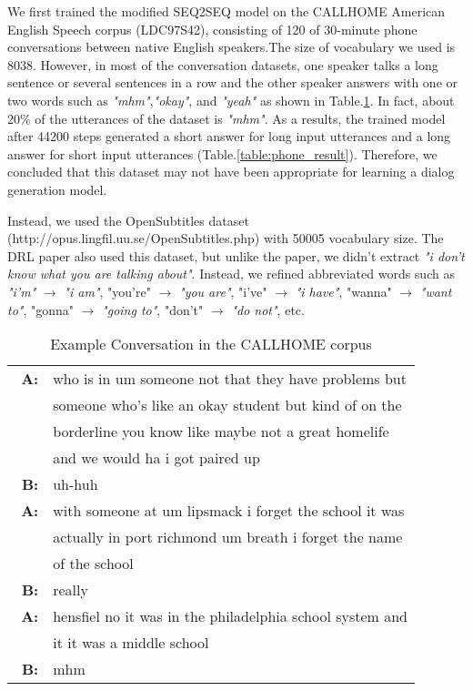 We first trained the modified SEQ2SEQ model on the CALLHOME American English Speech corpus (LDC97S42), consisting of 120 of 30-minute phone conversations between native English speakers.The size of vocabulary we used is 8038. However, in most of the conversation datasets, one speaker talks a long sentence or several sentences in a row and the other speaker answers with one or two words such as \textit{"mhm"},\textit{"okay"}, and \textit{"yeah"} as shown in Table.\ref{table:phone_data}. In fact, about 20\% of the utterances of the dataset is \textit{"mhm"}. As a results, the trained model after 44200 steps generated a short answer for long input utterances and a long answer for short input utterances (Table.\ref{table:phone_result}). Therefore, we concluded that this dataset may not have been appropriate for learning a dialog generation model.

Instead, we used the OpenSubtitles dataset (http://opus.lingfil.uu.se/OpenSubtitles.php) with 50005 vocabulary size. The DRL paper also used this dataset, but unlike the paper, we didn't extract \textit{"i don't know what you are talking about"}. Instead, we refined abbreviated words such as \textit{"i'm"} $\rightarrow$ \textit{"i am"}, {"you're"} $\rightarrow$ \textit{"you are"}, {"i've"} $\rightarrow$ \textit{"i have"}, {"wanna"} $\rightarrow$ \textit{"want to"}, {"gonna"} $\rightarrow$ \textit{"going to"}, {"don't"} $\rightarrow$ \textit{"do not"}, etc. 

\begin{table}[t!]
    \centering
    \small
    \caption{\small Example Conversation in the CALLHOME corpus}
    \begin{tabular}{rl}
      \hline
        \textbf{A:} & who is in um someone not that they have problems but\\
        		    & someone who's like an okay student but kind of on the\\
        			& borderline you know like maybe not a great homelife\\
        			& and we would ha i got paired up\\
		\textbf{B:} & uh-huh \\
\textbf{A:} & with someone at um lipsmack i forget the school it was\\
			& actually in port richmond um breath i forget the name\\
			& of the school\\\
\textbf{B:} & really\\
\textbf{A:} & hensfiel no it was in the philadelphia school system and\\ 
			& it it was a middle school\\
\textbf{B:} & mhm\\
      \hline
    \end{tabular}
    \label{table:phone_data}
\end{table}